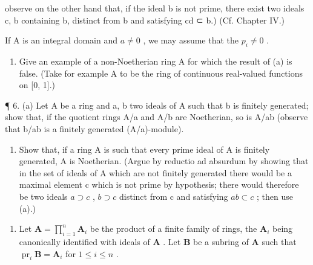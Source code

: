 observe on the other hand that, if the ideal b is not prime, there exist two ideals c, b containing b, distinct from b and satisfying cd ⊂ b.) (Cf. Chapter IV.)

If A is an integral domain and \(a \neq 0\) , we may assume that the \(p_{i} \neq 0\) .

\begin{enumerate}
\def\labelenumi{(\alph{enumi})}
\setcounter{enumi}{1}
\tightlist
\item
  Give an example of a non-Noetherian ring A for which the result of (a) is false. (Take for example A to be the ring of continuous real-valued functions on {[}0, 1{]}.)
\end{enumerate}

¶ 6. (a) Let A be a ring and a, b two ideals of A such that b is finitely generated; show that, if the quotient rings A/a and A/b are Noetherian, so is A/ab (observe that b/ab is a finitely generated (A/a)-module).

\begin{enumerate}
\def\labelenumi{(\alph{enumi})}
\setcounter{enumi}{1}
\tightlist
\item
  Show that, if a ring A is such that every prime ideal of A is finitely generated, A is Noetherian. (Argue by reductio ad absurdum by showing that in the set of ideals of A which are not finitely generated there would be a maximal element c which is not prime by hypothesis; there would therefore be two ideals \(a \supset c\) , \(b \supset c\) distinct from c and satisfying \(ab \subset c\) ; then use (a).)
\end{enumerate}

\begin{enumerate}
\def\labelenumi{\arabic{enumi}.}
\setcounter{enumi}{6}
\tightlist
\item
  Let \(\mathbf{A} = \prod_{i=1}^{n} \mathbf{A}_i\) be the product of a finite family of rings, the \(\mathbf{A}_i\) being canonically identified with ideals of \(\mathbf{A}\) . Let \(\mathbf{B}\) be a subring of \(\mathbf{A}\) such that \(\operatorname{pr}_i \mathbf{B} = \mathbf{A}_i\) for \(1 \leqslant i \leqslant n\) .
\end{enumerate}


